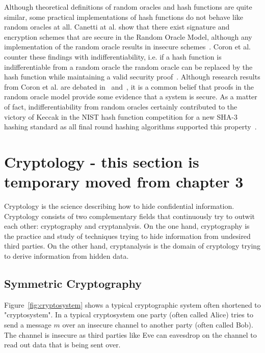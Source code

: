 Although theoretical definitions of random oracles and hash functions are quite similar, some practical implementations of hash functions do not behave like random oracles at all. Canetti at al. show that there exist signature and encryption schemes that are secure in the Random Oracle Model, although any implementation of the random oracle results in insecure schemes~\cite{art:CanettiGH04}. Coron et al. counter these findings with indifferentiability, i.e. if a hash function is indifferentiable from a random oracle the random oracle can be replaced by the hash function while maintaining a valid security proof~\cite{art:CoronDMP05}. Although research results from Coron et al. are debated in~\cite{art:FleischmannGL10} and~\cite{art:RistenpartSS11}, it is a common belief that proofs in the random oracle model provide some evidence that a system is secure. As a matter of fact, indifferentiability from random oracles certainly contributed to the victory of Keccak in the NIST hash function competition for a new SHA-3 hashing standard as all final round hashing algorithms supported this property~\cite{art:BartheGHOB13}.

\section{Cryptology - this section is temporary moved from chapter 3}
Cryptology is the science describing how to hide confidential information. Cryptology consists of two complementary fields that continuously try to outwit each other: cryptography and cryptanalysis. On the one hand, cryptography is the practice and study of techniques trying to hide information from undesired third parties. On the other hand, cryptanalysis is the domain of cryptology trying to derive information from hidden data.

\subsection{Symmetric Cryptography}
Figure~\ref{fig:cryptosystem} shows a typical cryptographic system often shortened to "cryptosystem". In a typical cryptosystem one party (often called Alice) tries to send a message $m$ over an insecure channel to another party (often called Bob). The channel is insecure as third parties like Eve can eavesdrop on the channel to read out data that is being sent over.

